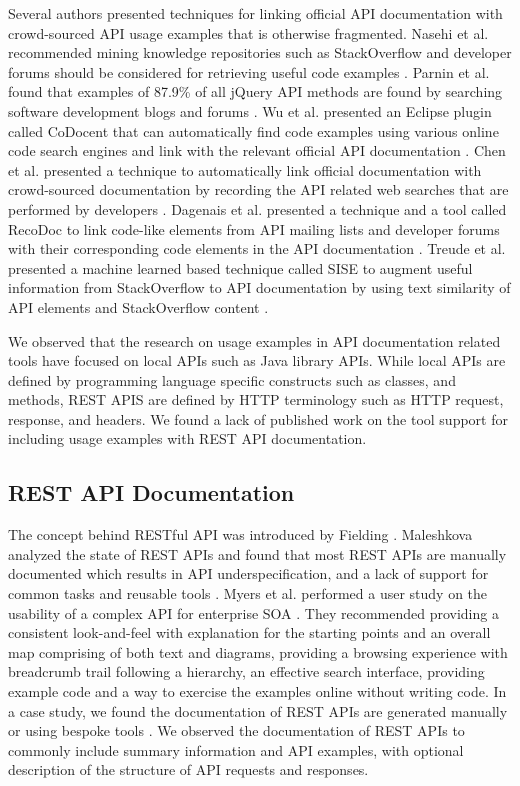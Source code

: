 \documentclass[10pt, conference]{IEEEtran}
\begin{document}
Several authors presented techniques for linking official API documentation with crowd-sourced API usage examples that is otherwise fragmented. Nasehi et al. recommended mining knowledge repositories such as StackOverflow and developer forums should be considered for retrieving useful code examples \cite{Nasehi_what_makes}. Parnin et al. found that examples of 87.9\% of all jQuery API methods are found by searching software development blogs and forums \cite{Parnin_measuring}. Wu et al. presented an Eclipse plugin called CoDocent that can automatically find code examples using various online code search engines and link with the relevant official API documentation \cite{wu2010codocent}. Chen et al. presented a technique to automatically link official documentation with crowd-sourced documentation by recording the API related web searches that are performed by developers \cite{Chen_who_asked}. Dagenais et al. presented a technique and a tool called RecoDoc to link code-like elements from API mailing lists and developer forums with their corresponding code elements in the API documentation \cite{dagenais2012recovering}. Treude et al. presented a machine learned based technique called SISE to augment useful information from StackOverflow to API documentation by using text similarity of API elements and StackOverflow content \cite{Treude:2016:AAD:2884781.2884800}.

We observed that the research on usage examples in API documentation related tools have focused on local APIs such as Java library APIs. While local APIs are defined by programming language specific constructs such as classes, and methods, REST APIS are defined by HTTP terminology such as HTTP request, response, and headers. We found a lack of published work on the tool support for including usage examples with REST API documentation.

\subsection{REST API Documentation} %
The concept behind RESTful API was introduced by Fielding \cite{Fielding_rest}. Maleshkova analyzed the state of REST APIs and found that most REST APIs are manually documented which results in API underspecification, and a lack of support for common tasks and reusable tools \cite{Maleshkova_investigating}. Myers et al. performed a user study on the usability of a complex API for enterprise SOA \cite{Myers_study}. They recommended providing a consistent look-and-feel with explanation for the starting points and an overall map comprising of both text and diagrams, providing a browsing experience with breadcrumb trail following a hierarchy, an effective search interface, providing example code and a way to exercise the examples online without writing code. In a case study, we found the documentation of REST APIs are generated manually or using bespoke tools \cite{sohan2015case}. We observed the documentation of REST APIs to commonly include summary information and API examples, with optional description of the structure of API requests and responses.
\end{document}
